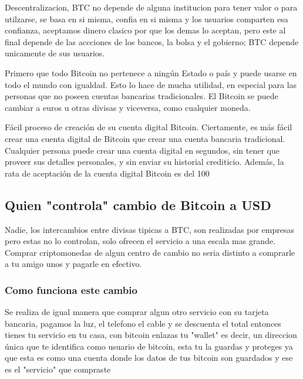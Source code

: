 \documentclass[12pt,letterpaper]{article}
\begin{document}
	Descentralizacion, BTC no depende de alguna institucion para tener valor o para utilzarse, se basa en si misma, confia en si misma y los usuarios comparten esa confianza, aceptamos dinero clasico por que los demas lo aceptan, pero este al final depende de las accciones de los bancos, la bolsa y el gobierno; BTC depende unicamente de sus usuarios.
	
	Primero que todo Bitcoin no pertenece a ning\'un Estado o pa\'is y puede usarse en todo el mundo con igualdad. Esto lo hace de mucha utilidad, en especial para las personas que no poseen cuentas bancarias tradicionales. El Bitcoin se puede cambiar a euros u otras divisas y viceversa, como cualquier moneda. 
	
	F\'acil proceso de creaci\'on de su cuenta digital Bitcoin. Ciertamente, es m\'as f\'acil crear una cuenta digital de Bitcoin que crear una cuenta bancaria tradicional. Cualquier persona puede crear una cuenta digital en segundos, sin tener que proveer sus detalles personales, y sin enviar su historial crediticio. Adem\'as, la rata de aceptaci\'on de la cuenta digital Bitcoin es del 100%
	
	\subsection*{Quien "controla" cambio de Bitcoin a USD}
	Nadie, los intercambios entre divisas tipicas a BTC, son realizadas por empresas pero estas no lo controlan, solo ofrecen el servicio a una escala mas grande. Comprar criptomonedas de algun centro de cambio no seria distinto a comprarle a tu amigo unos y pagarle en efectivo.
		\subsubsection*{Como funciona este cambio}
        Se realiza de igual manera que comprar algun otro servicio con su tarjeta bancaria, pagamos la luz, el telefono el cable y se descuenta el total entonces tienes tu servicio en tu casa, con bitcoin enlazas tu "wallet" es decir, un direccion \'unica que te identifica como usuario de bitcoin, esta tu la guardas y proteges ya que esta es como una cuenta donde los datos de tus bitcoin son guardados y ese es el "servicio" que compraste
\end{document}

